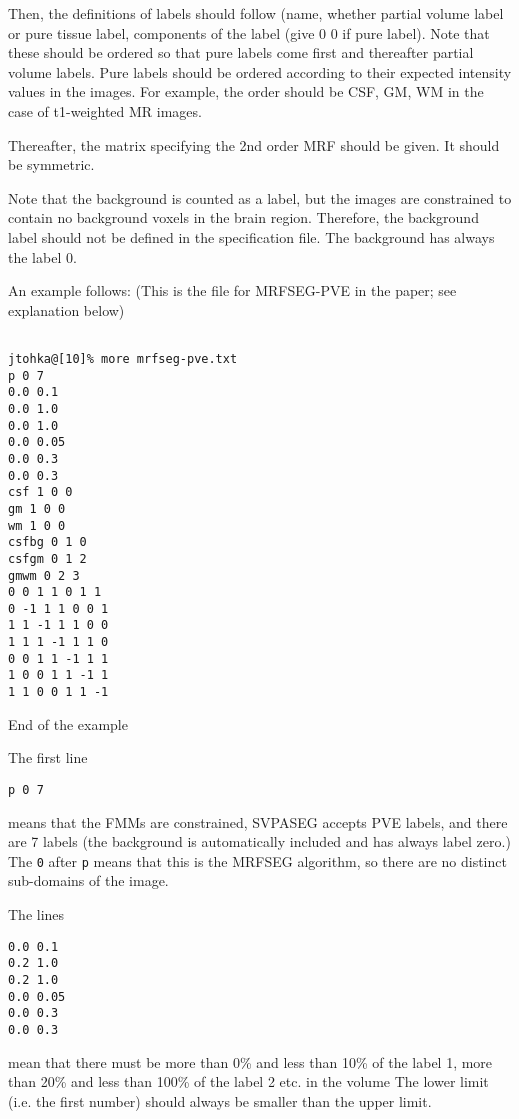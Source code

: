 \documentclass[12pt]{article}
\begin{document}
Then, the definitions of
labels should follow (name, whether partial volume label or pure
tissue label, components of the label (give 0 0 if pure
label). Note that these should be ordered so that pure labels come first and thereafter partial volume labels. Pure labels should be ordered according to their expected intensity values in the images. For example, the order should be CSF, GM, WM in the case of t1-weighted MR images.
 
Thereafter, the matrix specifying the 2nd order MRF should be given. It should be symmetric.

Note that the background is counted as a label, but the images are
constrained to contain no background voxels in the brain
region. Therefore, the background label should not be defined in the specification file. The
background has always the label 0.


An example follows: (This is the file for MRFSEG-PVE in the paper; see explanation below) 
\begin{verbatim}

jtohka@[10]% more mrfseg-pve.txt
p 0 7
0.0 0.1
0.0 1.0
0.0 1.0
0.0 0.05
0.0 0.3
0.0 0.3
csf 1 0 0
gm 1 0 0
wm 1 0 0
csfbg 0 1 0
csfgm 0 1 2
gmwm 0 2 3
0 0 1 1 0 1 1
0 -1 1 1 0 0 1
1 1 -1 1 1 0 0
1 1 1 -1 1 1 0
0 0 1 1 -1 1 1
1 0 0 1 1 -1 1
1 1 0 0 1 1 -1
\end{verbatim}

End of the example

The first line 
\begin{verbatim}
p 0 7
\end{verbatim}
means that the FMMs are constrained, SVPASEG accepts PVE labels, and there are 7 labels (the background is automatically
included and has always label zero.) The {\tt 0} after {\tt p} means that this is the MRFSEG algorithm, so there are no distinct sub-domains of the image.

The lines

\begin{verbatim}
0.0 0.1
0.2 1.0
0.2 1.0
0.0 0.05
0.0 0.3
0.0 0.3
\end{verbatim} 
mean that there must be more
than 0\% and less than 10\% of the label 1,  more than 20\%  and less
than 100\% of the label 2 etc. in the volume The lower
limit (i.e. the first number) should always be smaller than the upper
limit.
\end{document}
